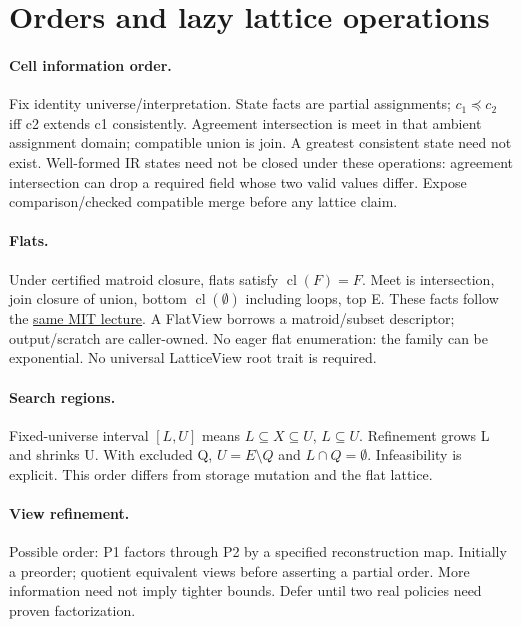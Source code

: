\documentclass[10pt,a4paper]{article}
\begin{document}
\section{Orders and lazy lattice operations}
\label{sec:orders}
\paragraph{Cell information order.}
Fix identity universe/interpretation. State facts are partial assignments; $c_1\preceq c_2$ iff c2 extends c1 consistently. Agreement intersection is meet in that ambient assignment domain; compatible union is join. A greatest consistent state need not exist. Well-formed IR states need not be closed under these operations: agreement intersection can drop a required field whose two valid values differ. Expose comparison/checked compatible merge before any lattice claim.

\paragraph{Flats.}
Under certified matroid closure, flats satisfy $\operatorname{cl}(F)=F$. Meet is intersection, join closure of union, bottom $\operatorname{cl}(\emptyset)$ including loops, top E. These facts follow the \href{https://ocw.mit.edu/courses/18-315-combinatorial-theory-hyperplane-arrangements-fall-2004/4b5dc2db132d782df7a9a5ca665c94da_lec3.pdf}{same MIT lecture}. A FlatView borrows a matroid/subset descriptor; output/scratch are caller-owned. No eager flat enumeration: the family can be exponential. No universal LatticeView root trait is required.

\paragraph{Search regions.}
Fixed-universe interval $[L,U]$ means $L\subseteq X\subseteq U$, $L\subseteq U$. Refinement grows L and shrinks U. With excluded Q, $U=E\setminus Q$ and $L\cap Q=\emptyset$. Infeasibility is explicit. This order differs from storage mutation and the flat lattice.

\paragraph{View refinement.}
Possible order: P1 factors through P2 by a specified reconstruction map. Initially a preorder; quotient equivalent views before asserting a partial order. More information need not imply tighter bounds. Defer until two real policies need proven factorization.
\end{document}
